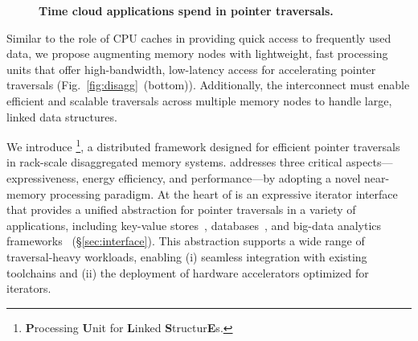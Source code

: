 \begin{figure}[ht!]
    \centering
    \caption[Time cloud applications spend in pointer traversals.]{\textbf{Time cloud applications spend in pointer traversals.}} 
    \label{fig:motivation}
\end{figure}

Similar to the role of CPU caches in providing quick access to frequently used data, we propose augmenting memory nodes with lightweight, fast processing units that offer high-bandwidth, low-latency access for accelerating pointer traversals (Fig.~\ref{fig:disagg}~(bottom)). Additionally, the interconnect must enable efficient and scalable traversals across multiple memory nodes to handle large, linked data structures.

We introduce \pulse\footnote{\textbf{P}rocessing \textbf{U}nit for \textbf{L}inked \textbf{S}tructur\textbf{E}s.}, a distributed framework designed for efficient pointer traversals in rack-scale disaggregated memory systems. \pulse addresses three critical aspects—expressiveness, energy efficiency, and performance—by adopting a novel near-memory processing paradigm. At the heart of \pulse is an expressive iterator interface that provides a unified abstraction for pointer traversals in a variety of applications, including key-value stores~\cite{redis, memcached}, databases~\cite{wiredtiger, btree1, btree2, trie1, trie3}, and big-data analytics frameworks~\cite{powergraph, graphx, graphchi, pagerank} (\S\ref{sec:interface}). This abstraction supports a wide range of traversal-heavy workloads, enabling (i) seamless integration with existing toolchains and (ii) the deployment of hardware accelerators optimized for iterators.

